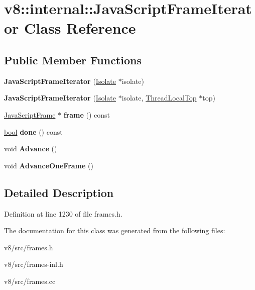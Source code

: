\hypertarget{classv8_1_1internal_1_1JavaScriptFrameIterator}{}\section{v8\+:\+:internal\+:\+:Java\+Script\+Frame\+Iterator Class Reference}
\label{classv8_1_1internal_1_1JavaScriptFrameIterator}
\subsection*{Public Member Functions}
\begin{DoxyCompactItemize}
\item 
\mbox{\label{classv8_1_1internal_1_1JavaScriptFrameIterator_ad9c9a26d81fd83d6020214fdbcc19d08}} 
{\bfseries Java\+Script\+Frame\+Iterator} (\mbox{\hyperlink{classv8_1_1internal_1_1Isolate}{Isolate}} $\ast$isolate)
\item 
\mbox{\label{classv8_1_1internal_1_1JavaScriptFrameIterator_ac5c453698cb67bfb0dd71c77a153467a}} 
{\bfseries Java\+Script\+Frame\+Iterator} (\mbox{\hyperlink{classv8_1_1internal_1_1Isolate}{Isolate}} $\ast$isolate, \mbox{\hyperlink{classv8_1_1internal_1_1ThreadLocalTop}{Thread\+Local\+Top}} $\ast$top)
\item 
\mbox{\label{classv8_1_1internal_1_1JavaScriptFrameIterator_a90757e472ddd53a99820d12cab0fdfa7}} 
\mbox{\hyperlink{classv8_1_1internal_1_1JavaScriptFrame}{Java\+Script\+Frame}} $\ast$ {\bfseries frame} () const
\item 
\mbox{\label{classv8_1_1internal_1_1JavaScriptFrameIterator_a80f4959d06c2e998791b961790aa8a56}} 
\mbox{\hyperlink{classbool}{bool}} {\bfseries done} () const
\item 
\mbox{\label{classv8_1_1internal_1_1JavaScriptFrameIterator_a5dd6b29e845d1590bd7b689c99b7d672}} 
void {\bfseries Advance} ()
\item 
\mbox{\label{classv8_1_1internal_1_1JavaScriptFrameIterator_a8ee181cf84d702525486cde148568316}} 
void {\bfseries Advance\+One\+Frame} ()
\end{DoxyCompactItemize}


\subsection{Detailed Description}


Definition at line 1230 of file frames.\+h.



The documentation for this class was generated from the following files\+:\begin{DoxyCompactItemize}
\item 
v8/src/frames.\+h\item 
v8/src/frames-\/inl.\+h\item 
v8/src/frames.\+cc\end{DoxyCompactItemize}
